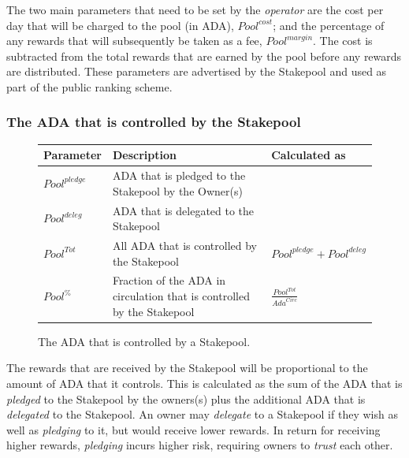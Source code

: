 \documentclass[11pt,a4paper,dvipsnames,twosided,final]{article}
\newcommand{\ada}{ADA{}}
\begin{document}
\noindent
The two main parameters that need to be set by the \emph{operator} are the cost per day that will be charged to
the pool (in \ada), $\textit{Pool}^{\textit{cost}}$; and the percentage of any rewards that will subsequently be taken as a fee, ${\textit{Pool}}^{\textit{margin}}$.
The cost is subtracted from the total rewards that are earned by the pool before any rewards are distributed.
These parameters are advertised by the Stakepool and used as part of the public ranking scheme.

\subsubsection*{The \ada{} that is controlled by the Stakepool}

\begin{figure}[h!]
\begin{center}
\begin{tabular}{||l|p{9cm}|l||}
  \hline \hline
\textbf{Parameter} & \textbf{Description} & \textbf{Calculated as} \\\hline
{\color{red} ${\textit{Pool}}^\textit{pledge}$} & {\color{red} \ada{} that is pledged to the Stakepool by the Owner(s)} & \\\hline
{\color{blue} ${\textit{Pool}}^\textit{deleg}$} & {\color{blue}  \ada{} that is delegated to the Stakepool} & \\\hline
${\textit{Pool}}^{Tot}$ & All \ada{} that is controlled by the Stakepool & ${\textit{Pool}}^\textit{pledge} + {\textit{Pool}}^\textit{deleg}$ \\\hline
${\textit{Pool}}^\%$ & Fraction of the \ada{} in circulation that is controlled by the Stakepool & {\large $\frac{{\textit{Pool}}^{Tot}}{\textit{Ada}^{Circ}}$} \\\hline
  \hline
\end{tabular}
\end{center}
\caption{The \ada{} that is controlled by a Stakepool.}
\end{figure}

\noindent
The rewards that are received by the Stakepool will be proportional to the amount of \ada{} that it controls.
This is calculated as the sum of the \ada{} that is \emph{pledged} to the Stakepool by the owners(s) plus
the additional \ada{} that is \emph{delegated} to the Stakepool.  An owner may \emph{delegate} to a Stakepool if
they wish as well as \emph{pledging} to it, but would receive lower rewards.  In return for receiving
higher rewards, \emph{pledging} incurs higher risk, requiring owners to \emph{trust} each other.
\end{document}
